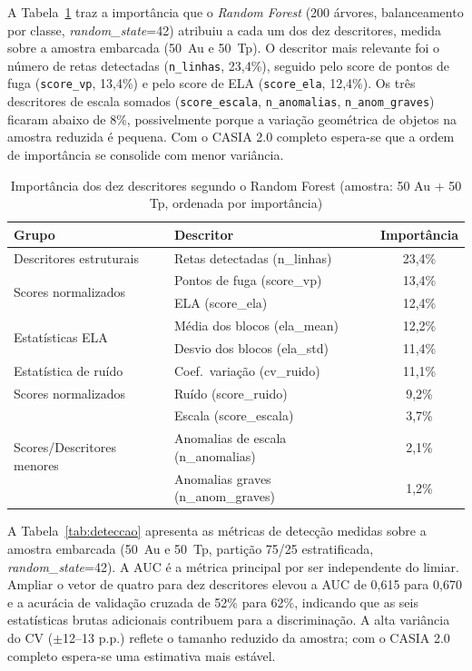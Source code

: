 \documentclass[12pt]{article}
\begin{document}
A Tabela~\ref{tab:importancias} traz a importância que o \textit{Random Forest}
(200 árvores, balanceamento por classe, \textit{random\_state}=42) atribuiu a cada
um dos dez descritores, medida sobre a amostra embarcada (50~Au e 50~Tp). O
descritor mais relevante foi o número de retas detectadas (\texttt{n\_linhas},
23,4\%), seguido pelo score de pontos de fuga (\texttt{score\_vp}, 13,4\%) e pelo
score de ELA (\texttt{score\_ela}, 12,4\%). Os três descritores de escala somados
(\texttt{score\_escala}, \texttt{n\_anomalias}, \texttt{n\_anom\_graves}) ficaram
abaixo de 8\%, possivelmente porque a variação geométrica de objetos na amostra
reduzida é pequena. Com o CASIA 2.0 completo espera-se que a ordem de importância
se consolide com menor variância.

\begin{table}[ht]
\centering
\caption{Importância dos dez descritores segundo o Random Forest (amostra: 50 Au + 50 Tp, ordenada por importância)}
\label{tab:importancias}
\begin{tabular}{llc}
\toprule
\textbf{Grupo} & \textbf{Descritor} & \textbf{Importância} \\
\midrule
Descritores estruturais
  & Retas detectadas (n\_linhas)        & 23,4\% \\
\midrule
\multirow{2}{*}{Scores normalizados}
  & Pontos de fuga (score\_vp)    & 13,4\% \\
  & ELA (score\_ela)              & 12,4\% \\
\midrule
\multirow{2}{*}{Estatísticas ELA}
  & Média dos blocos (ela\_mean)  & 12,2\% \\
  & Desvio dos blocos (ela\_std)  & 11,4\% \\
\midrule
Estatística de ruído
  & Coef.\ variação (cv\_ruido)   & 11,1\% \\
\midrule
Scores normalizados
  & Ruído (score\_ruido)          &  9,2\% \\
\midrule
\multirow{3}{*}{Scores/Descritores menores}
  & Escala (score\_escala)              &  3,7\% \\
  & Anomalias de escala (n\_anomalias)  &  2,1\% \\
  & Anomalias graves (n\_anom\_graves)  &  1,2\% \\
\bottomrule
\end{tabular}
\end{table}

A Tabela~\ref{tab:deteccao} apresenta as métricas de detecção medidas sobre a
amostra embarcada (50~Au e 50~Tp, partição 75/25 estratificada, \textit{random\_state}=42).
A AUC é a métrica principal por ser independente do limiar. Ampliar o vetor de
quatro para dez descritores elevou a AUC de 0,615 para 0,670 e a acurácia de
validação cruzada de 52\% para 62\%, indicando que as seis estatísticas brutas
adicionais contribuem para a discriminação. A alta variância do CV ($\pm$12--13
p.p.) reflete o tamanho reduzido da amostra; com o CASIA 2.0 completo espera-se
uma estimativa mais estável.
\end{document}
